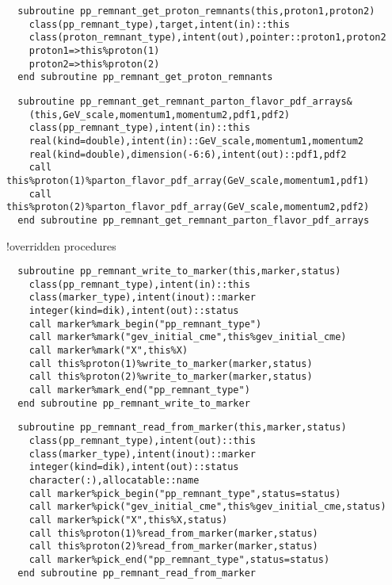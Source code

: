 \begin{Verbatim}
  subroutine pp_remnant_get_proton_remnants(this,proton1,proton2)
    class(pp_remnant_type),target,intent(in)::this
    class(proton_remnant_type),intent(out),pointer::proton1,proton2
    proton1=>this%proton(1)
    proton2=>this%proton(2)
  end subroutine pp_remnant_get_proton_remnants
\end{Verbatim}

\begin{Verbatim}
  subroutine pp_remnant_get_remnant_parton_flavor_pdf_arrays&
    (this,GeV_scale,momentum1,momentum2,pdf1,pdf2)
    class(pp_remnant_type),intent(in)::this
    real(kind=double),intent(in)::GeV_scale,momentum1,momentum2
    real(kind=double),dimension(-6:6),intent(out)::pdf1,pdf2
    call this%proton(1)%parton_flavor_pdf_array(GeV_scale,momentum1,pdf1)
    call this%proton(2)%parton_flavor_pdf_array(GeV_scale,momentum2,pdf2)
  end subroutine pp_remnant_get_remnant_parton_flavor_pdf_arrays
\end{Verbatim}

  !overridden procedures

\begin{Verbatim}
  subroutine pp_remnant_write_to_marker(this,marker,status)
    class(pp_remnant_type),intent(in)::this
    class(marker_type),intent(inout)::marker
    integer(kind=dik),intent(out)::status
    call marker%mark_begin("pp_remnant_type")
    call marker%mark("gev_initial_cme",this%gev_initial_cme)
    call marker%mark("X",this%X)
    call this%proton(1)%write_to_marker(marker,status)
    call this%proton(2)%write_to_marker(marker,status)
    call marker%mark_end("pp_remnant_type")
  end subroutine pp_remnant_write_to_marker
\end{Verbatim}

\begin{Verbatim}
  subroutine pp_remnant_read_from_marker(this,marker,status)
    class(pp_remnant_type),intent(out)::this
    class(marker_type),intent(inout)::marker
    integer(kind=dik),intent(out)::status
    character(:),allocatable::name
    call marker%pick_begin("pp_remnant_type",status=status)
    call marker%pick("gev_initial_cme",this%gev_initial_cme,status)
    call marker%pick("X",this%X,status)
    call this%proton(1)%read_from_marker(marker,status)
    call this%proton(2)%read_from_marker(marker,status)
    call marker%pick_end("pp_remnant_type",status=status)
  end subroutine pp_remnant_read_from_marker
\end{Verbatim}

